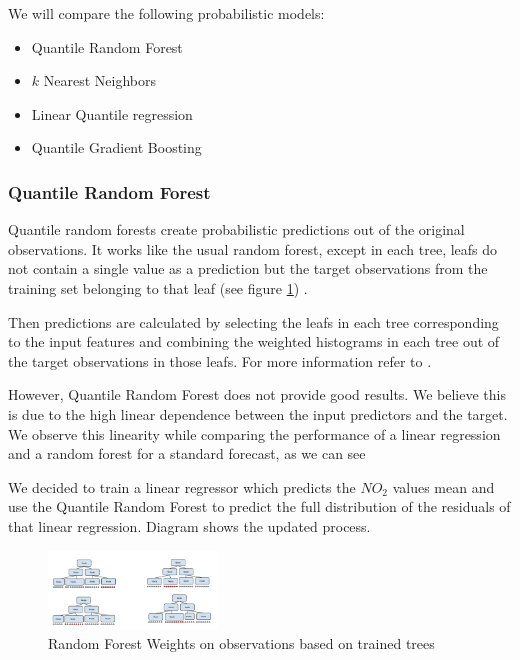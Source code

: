 \documentclass[a4paper,twocolumn,5p]{elsarticle}
\begin{document}
We will compare the following probabilistic models:
\begin{itemize}
  \item Quantile Random Forest
  \item $k$ Nearest Neighbors
  \item Linear Quantile regression
  \item Quantile Gradient Boosting 
\end{itemize}

\subsubsection{Quantile Random Forest}

Quantile random forests create probabilistic predictions out of 
the original observations. It works like the usual random forest, 
except in each tree,
leafs do not contain a single value as a prediction but the target observations 
from the training set 
belonging to that leaf (see figure \ref{figure:qrandom}) . 

Then predictions are calculated by selecting the leafs in each tree
corresponding to the input features and combining the weighted 
histograms in each tree out of the target observations in those leafs. 
For more information refer to 
\cite{quantregforests}.

However, Quantile Random Forest does not provide good results. We believe this is 
due to the high linear dependence between the input predictors and the target. 
We observe this linearity while comparing the performance of a linear regression and 
a random forest for a standard forecast, as we can see 

We decided to train a linear regressor
which predicts the $NO_2$ values mean and use the Quantile 
Random Forest to predict the full distribution of the residuals of that linear regression.
Diagram  shows the updated process.  

\begin{figure}
  \centering
  \includegraphics[width=0.4\textwidth]{quantile_random_forest}
  \caption{Random Forest Weights on observations based on trained trees}
  \label{figure:qrandom}
\end{figure}
\end{document}
